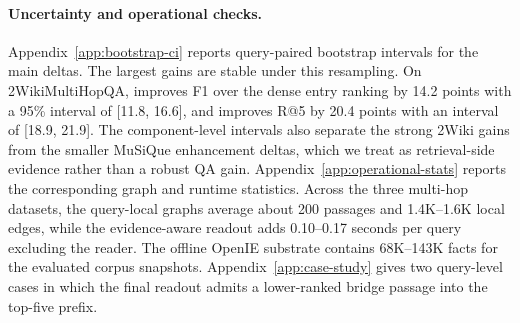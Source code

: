 \paragraph{Uncertainty and operational checks.}
Appendix~\ref{app:bootstrap-ci} reports query-paired bootstrap
intervals for the main deltas. The largest gains are stable under this
resampling. On 2WikiMultiHopQA, \methodname{} improves F1 over the dense
entry ranking by 14.2 points with a 95\% interval of [11.8, 16.6], and
improves R@5 by 20.4 points with an interval of [18.9, 21.9]. The
component-level intervals also separate the strong 2Wiki gains from the
smaller MuSiQue enhancement deltas, which we treat as retrieval-side
evidence rather than a robust QA gain. Appendix~\ref{app:operational-stats}
reports the corresponding graph and runtime statistics. Across the
three multi-hop datasets, the query-local graphs average about 200
passages and 1.4K--1.6K local edges, while the evidence-aware readout
adds 0.10--0.17 seconds per query excluding the reader. The offline
OpenIE substrate contains 68K--143K facts for the evaluated corpus
snapshots. Appendix~\ref{app:case-study} gives two query-level cases in
which the final readout admits a lower-ranked bridge passage into the
top-five prefix.
